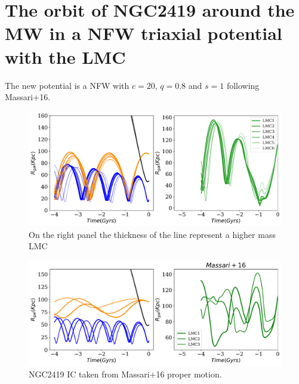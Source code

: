 \documentclass[14pt]{article}
\begin{document}
\section{The orbit of NGC2419 around the MW in a NFW triaxial
potential with the LMC}


The new potential is a NFW with $c=20$, $q=0.8$ and $s=1$ following
Massari+16.

\begin{figure}[H]
\centering
\includegraphics[scale=0.5]{../exploratory_code/gal_orbits_all_LMCs_Triaxial.pdf}
On the right panel the thickness of the line represent a higher mass
LMC
\end{figure}

\begin{figure}[H]
\centering
\includegraphics[scale=0.5]{../exploratory_code/gal_orbits_all_LMCs_massari_T.pdf}
\caption{NGC2419 IC taken from Massari+16 proper motion.}
\end{figure}
\end{document}
